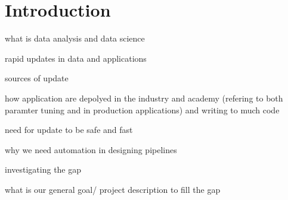 \section{Introduction}
\label{sec:intro}
what is data analysis and data science

rapid updates in data and applications

sources of update

how application are depolyed in the industry and academy (refering to both paramter tuning and in production applications) and writing to much code

need for update to be safe and fast

why we need automation in designing pipelines 

investigating the gap 

what is our general goal/ project description to fill the gap

